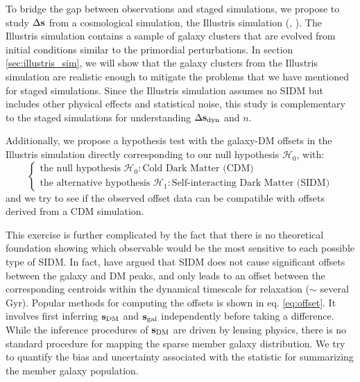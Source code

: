 To bridge the gap between observations and staged simulations, we propose to
study $\Delta {\bf s}$ from a cosmological simulation, the Illustris simulation
(\citealt{Vogelsberger2014}, \citealt{Genel2014a}). 
The Illustris simulation contains a sample of galaxy clusters that are evolved
from initial conditions similar to the primordial
perturbations. In section \ref{sec:illustris_sim},
we will show that the galaxy clusters from the Illustris simulation 
are realistic enough to mitigate the problems that we have mentioned 
for staged simulations. Since the Illustris simulation assumes no SIDM but 
includes other physical effects and statistical noise, 
this study is complementary to the 
staged simulations for understanding $\Delta {\bf s}_{\rm dyn}$ and $n$. 

Additionally, we propose a hypothesis test with the galaxy-DM offsets in
the Illustris simulation directly corresponding to our null hypothesis
$\mathcal{H}_0$, with: 
\begin{equation}
\begin{cases}
	\text{the null hypothesis }\mathcal{H}_0: \text{Cold Dark Matter (CDM)} \\
	\text{the alternative hypothesis }\mathcal{H}_1: \text{Self-interacting Dark
	Matter (SIDM)} 
\end{cases}
\end{equation}
and we try to see if the observed offset data can be compatible with offsets
derived from a CDM simulation. 


This exercise is further complicated by the fact that there is no theoretical
foundation showing which observable would be the most sensitive to each
possible type of SIDM. In fact, \cite{Kahlhoefer14} have argued that SIDM 
does not cause
significant offsets between the galaxy and DM peaks, and only leads to an offset
between the corresponding centroids within the dynamical timescale for
relaxation ($\sim$ several Gyr). 
Popular methods for computing the offsets is shown in eq. \ref{eq:offset}.
It involves first inferring ${\bf s}_{\rm DM}$ 
and ${\bf s}_{\rm gal}$ independently before taking a difference.
While the inference procedures of ${\bf s}_{\rm DM}$ are driven by lensing 
physics, there is no standard procedure for
mapping the sparse member galaxy distribution. 
We try to quantify the bias and uncertainty associated with the
statistic for summarizing the member galaxy population. 

